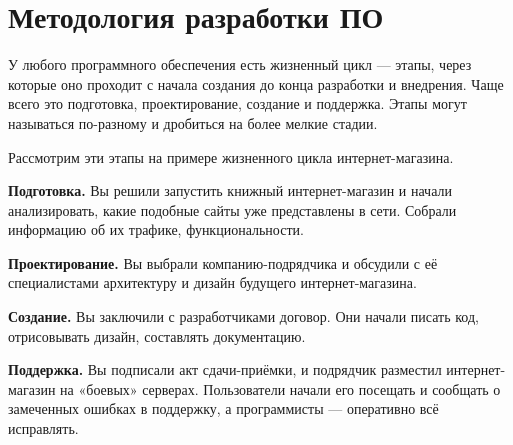 \documentclass[a4paper]{article}
\begin{document}
\section{Методология разработки ПО}

У любого программного обеспечения есть жизненный цикл — этапы, через которые оно проходит с начала создания до конца разработки и внедрения. Чаще всего это подготовка, проектирование, создание и поддержка. Этапы могут называться по-разному и дробиться на более мелкие стадии.

\begin{figure}[h]
\end{figure}

Рассмотрим эти этапы на примере жизненного цикла интернет-магазина.

\noindent\textbf{Подготовка.} Вы решили запустить книжный интернет-магазин и начали анализировать, какие подобные сайты уже представлены в сети. Собрали информацию об их трафике, функциональности.

\noindent\textbf{Проектирование.} Вы выбрали компанию-подрядчика и обсудили с её специалистами архитектуру и дизайн будущего интернет-магазина.

\noindent\textbf{Создание.} Вы заключили с разработчиками договор. Они начали писать код, отрисовывать дизайн, составлять документацию.

\noindent\textbf{Поддержка.} Вы подписали акт сдачи-приёмки, и подрядчик разместил интернет-магазин на «боевых» серверах. Пользователи начали его посещать и сообщать о замеченных ошибках в поддержку, а программисты — оперативно всё исправлять.
\end{document}
